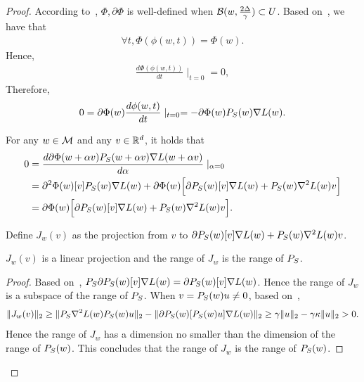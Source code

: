 \begin{proof}
According to~, $\Phi, \partial \Phi$ is well-defined when $\mathcal{B}(w, \frac{2 \Delta}{\gamma}) \subset U$. Based on~, we have that
\begin{align*}
    \forall t, \Phi( \phi(w, t)) = \Phi(w). 
\end{align*}
Hence,
\begin{align*}
     \frac{ d\Phi( \phi(w, t)) }{dt}\mid_{t = 0} = 0,
\end{align*}
Therefore,
\begin{align*}
    0 = \partial \Phi(w) \frac{d \phi(w,t)}{dt} \mid_{t = 0} = -\partial \Phi(w) {P}_S(w) \nabla L(w).
\end{align*}

For any $w \in \mathcal{M}$ and any $v \in \mathbb{R}^d$, it holds that
\begin{align}
    0&= \frac{d \partial \Phi(w + \alpha v) {P}_S(w + \alpha v) \nabla L(w + \alpha v)}{d \alpha}  \mid_{\alpha = 0} \notag \\
    &= \partial^2 \Phi(w)[v] {P}_S(w) \nabla L(w) + \partial \Phi(w) \Big[ \partial {P}_S(w)[v]\nabla L(w) + {P}_S(w) \nabla^2 L(w) v\Big] \notag \\
    &=  \partial \Phi(w) \Big[ \partial {P}_S(w)[v]\nabla L(w) + {P}_S(w) \nabla^2 L(w) v\Big].\label{eq:onriverphi}
\end{align}

Define $J_w(v)$ as the projection from $v$ to $ \partial {P}_S(w)[v]\nabla L(w) + {P}_S(w) \nabla^2 L(w) v$. 

\begin{lemma}
\label{lem:range}
    $J_w(v)$ is a linear projection and the range of $J_w$ is the range of ${P}_S$. 
\end{lemma}
\begin{proof}
Based on~, ${P}_S \partial {P}_S(w)[v]\nabla L(w) = \partial {P}_S(w)[v]\nabla L(w)$. Hence the range of $J_w$ is a subspace of the range of ${P}_S$. 
    When $v = {P}_S(w) u \neq 0$, based on~,
\begin{align*}
    \| J_w(v) \|_2 \ge \| {P}_S \nabla^2 L(w) {P}_S(w) u \|_2 - \| \partial {P}_S(w)[{P}_S(w) u]\nabla L(w) \|_2 \ge \gamma \|u\|_2 - \gamma \kappa \| u \|_2  > 0.
\end{align*}
Hence the range of $J_w$ has a dimension no smaller than the dimension of the range of ${P}_S(w)$. This concludes that the range of $J_w$ is the range of ${P}_S(w)$.
\end{proof}


\end{proof}
